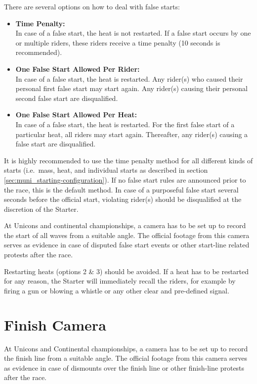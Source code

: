 There are several options on how to deal with false starts:
\begin{itemize}
\item \textbf{Time Penalty:}\\
In case of a false start, the heat is not restarted.
If a false start occurs by one or multiple riders, these riders receive a time penalty (10 seconds is recommended).
\item \textbf{One False Start Allowed Per Rider:}\\
In case of a false start, the heat is restarted.
Any rider(s) who caused their personal first false start may start again.
Any rider(s) causing their personal second false start are disqualified.
\item \textbf{One False Start Allowed Per Heat:}\\
In case of a false start, the heat is restarted.
For the first false start of a particular heat, all riders may start again.
Thereafter, any rider(s) causing a false start are disqualified.
\end{itemize}

It is highly recommended to use the time penalty method for all different kinds of starts (i.e.\ mass, heat, and individual starts as described in section \ref{sec:muni_starting-configuration}).
If no false start rules are announced prior to the race, this is the default method.
In case of a purposeful false start several seconds before the official start, violating rider(s) should be disqualified at the discretion of the Starter.

At Unicons and continental championships, a camera has to be set up to record the start of all waves from a suitable angle.
The official footage from this camera serves as evidence in case of disputed false start events or other start-line related protests after the race.

Restarting heats (options 2 \& 3) should be avoided.
If a heat has to be restarted for any reason, the Starter will immediately recall the riders, for example by firing a gun or blowing a whistle or any other clear and pre-defined signal.

\section{Finish Camera}
At Unicons and Continental championships, a camera has to be set up to record the finish line from a suitable angle.
The official footage from this camera serves as evidence in case of dismounts over the finish line or other finish-line protests after the race.
